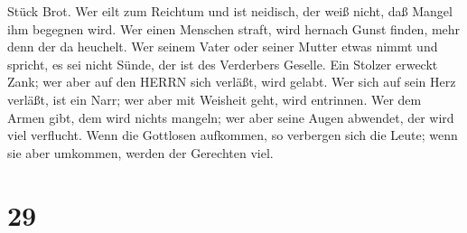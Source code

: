 Stück Brot.  Wer eilt zum Reichtum und ist neidisch, der
weiß nicht, daß Mangel ihm begegnen wird.  Wer einen
Menschen straft, wird hernach Gunst finden, mehr denn der da heuchelt.
 Wer seinem Vater oder seiner Mutter etwas nimmt und
spricht, es sei nicht Sünde, der ist des Verderbers Geselle.
 Ein Stolzer erweckt Zank; wer aber auf den HERRN sich
verläßt, wird gelabt.  Wer sich auf sein Herz verläßt, ist
ein Narr; wer aber mit Weisheit geht, wird entrinnen.  Wer
dem Armen gibt, dem wird nichts mangeln; wer aber seine Augen abwendet,
der wird viel verflucht.  Wenn die Gottlosen aufkommen, so
verbergen sich die Leute; wenn sie aber umkommen, werden der Gerechten
viel.

\hypertarget{section-28}{%
\section{29}\label{section-28}}

